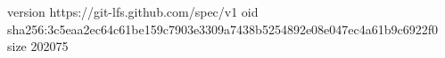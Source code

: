 version https://git-lfs.github.com/spec/v1
oid sha256:3c5eaa2ec64c61be159c7903e3309a7438b5254892e08e047ec4a61b9c6922f0
size 202075
